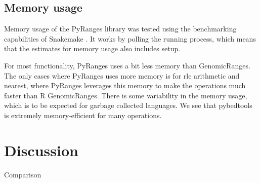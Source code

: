 \documentclass[10pt,letterpaper]{article}
\begin{document}
\subsection*{Memory usage}

Memory usage of the PyRanges library was tested using the benchmarking
capabilities of Snakemake \cite{doi:10.1093/bioinformatics/bty350}. It works by
polling the running process, which means that the estimates for memory usage
also includes setup.

For most functionality, PyRanges uses a bit less memory than GenomicRanges. The
only cases where PyRanges uses more memory is for rle arithmetic and nearest,
where PyRanges leverages this memory to make the operations much faster
than R GenomicRanges. There is some variability in the memory usage, which is to
be expected for garbage collected languages. We see that pybedtools is extremely
memory-efficient for many operations.


\section*{Discussion}

Comparison




\end{document}
